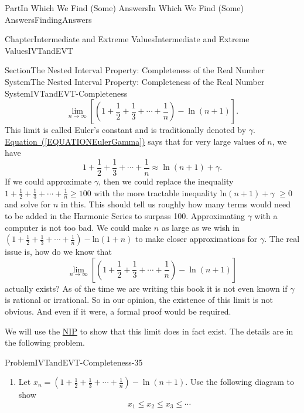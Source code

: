 \documentclass[oneside,10pt,]{book}
\newcommand{\xreffont}{\relax}
\numberwithin{equation}{part}
\def\limit#1#2#3{{\displaystyle\lim_{#1\rightarrow #2}#3}}
\begin{document}
\begin{partptx}{Part}{In Which We Find (Some) Answers}{}{In Which We Find (Some) Answers}{}{}{FindingAnswers}
\begin{chapterptx}{Chapter}{Intermediate and Extreme Values}{}{Intermediate and Extreme Values}{}{}{IVTandEVT}
\begin{sectionptx}{Section}{The Nested Interval Property: Completeness of the Real Number System}{}{The Nested Interval Property: Completeness of the Real Number System}{}{}{IVTandEVT-Completeness}
\begin{equation}
\limit{n}{\infty}{\left[\left(1+\frac{1}{2}+\frac{1}{3}+\cdots+
\frac{1}{n}\right)-\ln(n+1)\right]} \text{.}\label{EQUATIONEulerGamma}
\end{equation}
This limit is called Euler's constant and is traditionally denoted by \(\gamma\).  \hyperref[EQUATIONEulerGamma]{Equation~({\xreffont\ref{EQUATIONEulerGamma}})} says that for very large values of \(n\), we have%
\begin{equation*}
1+\frac{1}{2}+\frac{1}{3}+\cdots+\frac{1}{n}\approx
\ln\left(n+1\right)+\gamma\text{.}
\end{equation*}
If we could approximate \(\gamma\), then we could replace the inequality \(1+\frac{1}{2}+\frac{1}{3}+\cdots+\frac{1}{n}\geq 100\) with the more tractable inequality ln\(\left(n+1\right)+\gamma\) \(\geq 0\) and solve for \(n\) in this.  This should tell us roughly how many terms would need to be added in the Harmonic Series to surpass 100. Approximating \(\gamma\) with a computer is not too bad. We could make \(n\) as large as we wish in \(\left(1+\frac{1}{2}+\frac{1}{3}+\cdots+\frac{1}{n}\right)-\)ln\(\left(1+n\right)\) to make closer approximations for \(\gamma\).  The real issue is, how do we know that%
\begin{equation*}
\limit{n}{\infty}{\left[\left(1+\frac{1}{2}+\frac{1}{3}+\cdots+
\frac{1}{n}\right)-\ln(n+1)\right]}
\end{equation*}
actually exists?  As of the time we are writing this book it is not even known if \(\gamma\) is rational or irrational.  So in our opinion, the existence of this limit is not obvious.  And even if it were, a formal proof would be required.%
\par
We will use the \hyperref[NIP]{NIP} to show that this limit does in fact exist.  The details are in the following problem.%
\begin{problem}{Problem}{}{IVTandEVT-Completeness-35}%
\begin{enumerate}[font=\bfseries,label=(\alph*),ref=\alph*]%
\item{}Let \(x_n=\left(1+\frac{1}{2}+\frac{1}{3}+\cdots+\frac{1}{n}\right)-\ln\left(n+1
\right)\).  Use the following diagram to show%
\begin{equation*}
x_1\leq x_2\leq x_3\leq\cdots
\end{equation*}
%
\begin{image}{0.08}{0.84}{0.08}{}%

\end{image}
\end{enumerate}
\end{problem}
\end{sectionptx}
\end{chapterptx}
\end{partptx}
\end{document}
